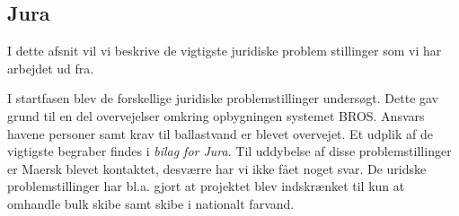 \subsection{Jura}
I dette afsnit vil vi beskrive de vigtigste juridiske problem stillinger som vi har arbejdet ud fra.

I startfasen blev de forskellige juridiske problemstillinger undersøgt. Dette gav grund til en del overvejelser omkring opbygningen systemet BROS. Ansvars havene personer samt krav til ballastvand er blevet overvejet. Et udplik af de vigtigste begraber findes i \textit{bilag for Jura}.
Til uddybelse af disse problemstillinger er Maersk blevet kontaktet, desværre har vi ikke fået noget svar. De uridske problemstillinger har bl.a. gjort at projektet blev indskrænket til kun at omhandle bulk skibe samt skibe i nationalt farvand.

